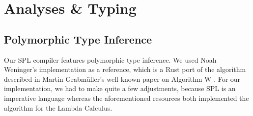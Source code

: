\chapter{Analyses \& Typing}\label{chapter:typing}

\section{Polymorphic Type Inference}
Our SPL compiler features polymorphic type inference. We used Noah Weninger's implementation \cite{weninger_2016} as a reference, which is a Rust port of the algorithm described in Martin Grabmüller's well-known paper on Algorithm W \cite{grabmuller}. For our implementation, we had to make quite a few adjustments, because SPL is an imperative language whereas the aforementioned resources both implemented the algorithm for the Lambda Calculus.

